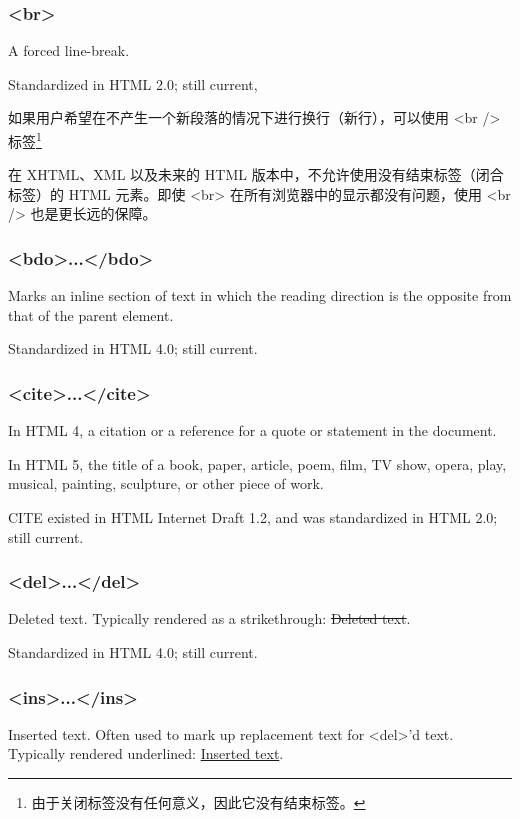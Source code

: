 \subsubsection{<br>}

A forced line-break.

Standardized in HTML 2.0; still current,

如果用户希望在不产生一个新段落的情况下进行换行（新行），可以使用 <br /> 标签\footnote{由于关闭标签没有任何意义，因此它没有结束标签。}

在 XHTML、XML 以及未来的 HTML 版本中，不允许使用没有结束标签（闭合标签）的 HTML 元素。即使 <br> 在所有浏览器中的显示都没有问题，使用 <br /> 也是更长远的保障。



\subsubsection{<bdo>...</bdo>}

Marks an inline section of text in which the reading direction is the opposite from that of the parent element.

Standardized in HTML 4.0; still current.


\subsubsection{<cite>...</cite>}

In HTML 4, a citation or a reference for a quote or statement in the document.

In HTML 5, the title of a book, paper, article, poem, film, TV show, opera, play, musical, painting, sculpture, or other piece of work.

CITE existed in HTML Internet Draft 1.2, and was standardized in HTML 2.0; still current.


\subsubsection{<del>...</del>}

Deleted text. Typically rendered as a strikethrough: \sout{Deleted text}.

Standardized in HTML 4.0; still current.


\subsubsection{<ins>...</ins>}

Inserted text. Often used to mark up replacement text for <del>'d text. Typically rendered underlined: \uline{Inserted text}.


